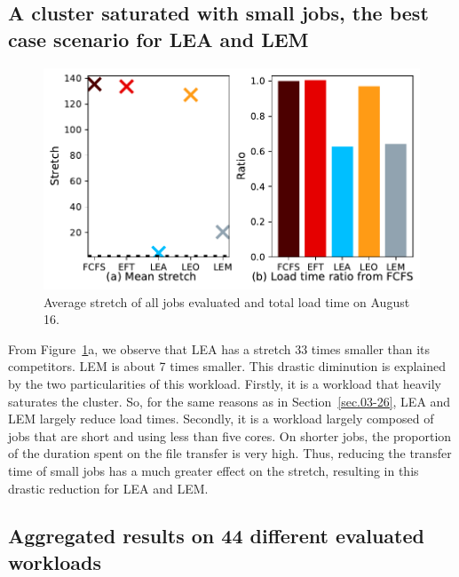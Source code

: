 \documentclass[sigconf,review,anonymous]{acmart}
\begin{document}
\subsection{A cluster saturated with small jobs, the best case scenario for LEA and LEM}\label{sec.08-16}

\begin{figure}[t]\centering\includegraphics[width=0.9\linewidth]{../MBSS/plot/Results_FCFS_Score_Backfill_2022-08-16->2022-08-16_V10000_Mean_Stretch_Total_waiting_for_a_load_time_and_transfer_time_450_128_32_256_4_1024.pdf}\caption{Average stretch of all jobs evaluated and total load time on August 16.}\label{stretch.08-16}\end{figure}

From Figure~\ref{stretch.08-16}a, we observe that LEA has a stretch 33 times smaller than
its competitors. LEM is about 7 times smaller. This drastic diminution is explained
by the two particularities of this workload.
Firstly, it is a workload that heavily saturates the cluster.
So, for the same reasons as in Section~\ref{sec.03-26}, LEA and LEM largely reduce load times.
Secondly, it is a workload largely composed of jobs that are short and using less than five cores.
On shorter jobs, the proportion of the duration spent on the file transfer is very high. 
Thus, reducing the transfer time of small jobs has a much greater effect on the stretch, resulting in this 
drastic reduction for LEA and LEM.

\subsection{Aggregated results on 44 different evaluated workloads}
\end{document}
